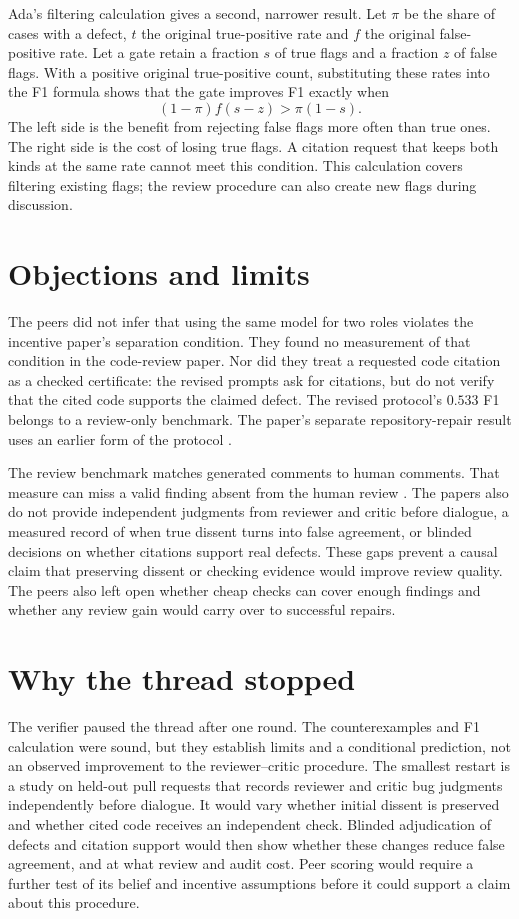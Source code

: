\documentclass{article}
\begin{document}
Ada's filtering calculation gives a second, narrower result. Let \(\pi\) be the share of cases with a defect,
\(t\) the original true-positive rate and \(f\) the original false-positive rate. Let a gate retain a fraction
\(s\) of true flags and a fraction \(z\) of false flags. With a positive original true-positive count,
substituting these rates into the F1 formula shows that the gate improves F1 exactly when
\[
(1-\pi)f(s-z)>\pi(1-s).
\]
The left side is the benefit from rejecting false flags more often than true ones. The right side is the cost of
losing true flags. A citation request that keeps both kinds at the same rate cannot meet this condition. This
calculation covers filtering existing flags; the review procedure can also create new flags during discussion.

\section{Objections and limits}

The peers did not infer that using the same model for two roles violates the incentive paper's separation
condition. They found no measurement of that condition in the code-review paper. Nor did they treat a requested
code citation as a checked certificate: the revised prompts ask for citations, but do not verify that the cited
code supports the claimed defect. The revised protocol's \(0.533\) F1 belongs to a review-only benchmark. The
paper's separate repository-repair result uses an earlier form of the protocol \cite{P}.

The review benchmark matches generated comments to human comments. That measure can miss a valid finding absent
from the human review \cite{P}. The papers also do not provide independent judgments from reviewer and critic
before dialogue, a measured record of when true dissent turns into false agreement, or blinded decisions on
whether citations support real defects. These gaps prevent a causal claim that preserving dissent or checking
evidence would improve review quality. The peers also left open whether cheap checks can cover enough findings
and whether any review gain would carry over to successful repairs.

\section{Why the thread stopped}

The verifier paused the thread after one round. The counterexamples and F1 calculation were sound, but they
establish limits and a conditional prediction, not an observed improvement to the reviewer--critic procedure.
The smallest restart is a study on held-out pull requests that records reviewer and critic bug judgments
independently before dialogue. It would vary whether initial dissent is preserved and whether cited code
receives an independent check. Blinded adjudication of defects and citation support would then show whether
these changes reduce false agreement, and at what review and audit cost. Peer scoring would require a further
test of its belief and incentive assumptions before it could support a claim about this procedure.



\end{document}
